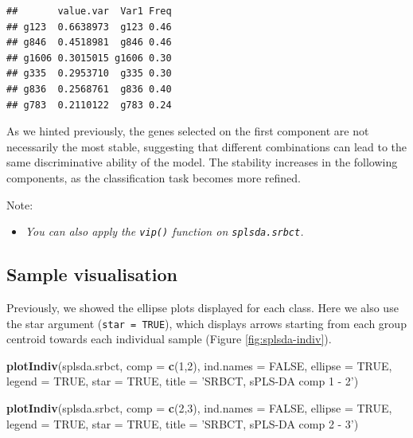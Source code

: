 \documentclass[]{book}
\newenvironment{Shaded}{\begin{snugshade}}{\end{snugshade}}
\newcommand{\DataTypeTok}[1]{\textcolor[rgb]{0.13,0.29,0.53}{#1}}
\newcommand{\DecValTok}[1]{\textcolor[rgb]{0.00,0.00,0.81}{#1}}
\newcommand{\KeywordTok}[1]{\textcolor[rgb]{0.13,0.29,0.53}{\textbf{#1}}}
\newcommand{\NormalTok}[1]{#1}
\newcommand{\OtherTok}[1]{\textcolor[rgb]{0.56,0.35,0.01}{#1}}
\newcommand{\StringTok}[1]{\textcolor[rgb]{0.31,0.60,0.02}{#1}}
\providecommand{\tightlist}{%
  \setlength{\itemsep}{0pt}\setlength{\parskip}{0pt}}
\begin{document}
\begin{verbatim}
##       value.var  Var1 Freq
## g123  0.6638973  g123 0.46
## g846  0.4518981  g846 0.46
## g1606 0.3015015 g1606 0.30
## g335  0.2953710  g335 0.30
## g836  0.2568761  g836 0.40
## g783  0.2110122  g783 0.24
\end{verbatim}

As we hinted previously, the genes selected on the first component are not necessarily the most stable, suggesting that different combinations can lead to the same discriminative ability of the model. The stability increases in the following components, as the classification task becomes more refined.

Note:

\begin{itemize}
\tightlist
\item
  \emph{You can also apply the \texttt{vip()} function on \texttt{splsda.srbct}.}
\end{itemize}

\hypertarget{sample-visualisation}{%
\subsection{Sample visualisation}\label{sample-visualisation}}

Previously, we showed the ellipse plots displayed for each class. Here we also use the star argument (\texttt{star\ =\ TRUE}), which displays arrows starting from each group centroid towards each individual sample (Figure \ref{fig:splsda-indiv}).

\begin{Shaded}
\begin{Highlighting}[]
\KeywordTok{plotIndiv}\NormalTok{(splsda.srbct, }\DataTypeTok{comp =} \KeywordTok{c}\NormalTok{(}\DecValTok{1}\NormalTok{,}\DecValTok{2}\NormalTok{),}
          \DataTypeTok{ind.names =} \OtherTok{FALSE}\NormalTok{,}
          \DataTypeTok{ellipse =} \OtherTok{TRUE}\NormalTok{, }\DataTypeTok{legend =} \OtherTok{TRUE}\NormalTok{,}
          \DataTypeTok{star =} \OtherTok{TRUE}\NormalTok{,}
          \DataTypeTok{title =} \StringTok{'SRBCT, sPLS-DA comp 1 - 2'}\NormalTok{)}
\end{Highlighting}
\end{Shaded}

\begin{Shaded}
\begin{Highlighting}[]
\KeywordTok{plotIndiv}\NormalTok{(splsda.srbct, }\DataTypeTok{comp =} \KeywordTok{c}\NormalTok{(}\DecValTok{2}\NormalTok{,}\DecValTok{3}\NormalTok{),}
          \DataTypeTok{ind.names =} \OtherTok{FALSE}\NormalTok{,}
          \DataTypeTok{ellipse =} \OtherTok{TRUE}\NormalTok{, }\DataTypeTok{legend =} \OtherTok{TRUE}\NormalTok{,}
          \DataTypeTok{star =} \OtherTok{TRUE}\NormalTok{,}
          \DataTypeTok{title =} \StringTok{'SRBCT, sPLS-DA comp 2 - 3'}\NormalTok{)}
\end{Highlighting}
\end{Shaded}
\end{document}

